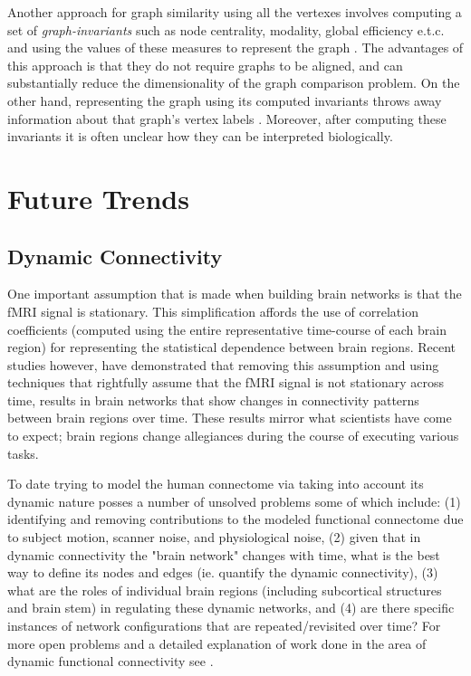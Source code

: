 Another approach for graph similarity using all the vertexes involves computing a set of \emph{graph-invariants} such as node centrality, modality, global efficiency e.t.c. and using the values of these measures to represent the graph \cite{rubinov} . The advantages of this approach is that they do not require graphs to be aligned, and can substantially reduce the dimensionality of the graph comparison problem. On the other hand, representing the graph using its computed invariants throws away information about that graph's vertex labels \cite{Vogelstein2012}. Moreover, after computing these invariants it is often unclear how they can be interpreted biologically. 

\section*{Future Trends}

\subsection*{Dynamic Connectivity}
One important assumption that is made when building brain networks is that the fMRI signal is stationary. This simplification affords the use of correlation coefficients (computed using the entire representative time-course of each brain region) for representing the statistical dependence between brain regions. Recent studies \cite{Hutchinson2013, Fu2013,} however, have demonstrated that removing this assumption and using techniques that rightfully assume that the fMRI signal is not stationary across time, results in brain networks that show changes in connectivity patterns between brain regions over time. These results mirror what scientists have come to expect; brain regions change allegiances during the course of executing various tasks.

To date trying to model the human connectome via taking into account its dynamic nature posses a number of unsolved problems \cite{Hutchinson2013} some of which include: (1) identifying and removing contributions to the modeled functional connectome due to subject motion, scanner noise, and physiological noise, (2) given that in dynamic connectivity the "brain network" changes with time, what is the best way to define its nodes and edges (ie. quantify the dynamic connectivity), (3) what are the roles of individual brain regions (including subcortical structures and brain stem) in regulating these dynamic networks, and (4) are there specific instances of network configurations that are repeated/revisited over time? For more open problems and a detailed explanation of work done in the area of dynamic functional connectivity see \cite{Hutchinson2013}.

